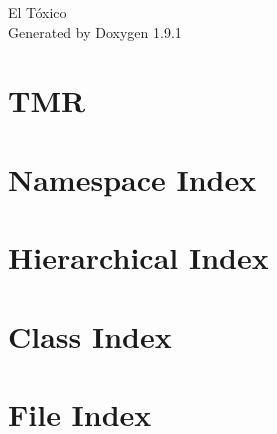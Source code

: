 \let\mypdfximage\pdfximage\def\pdfximage{\immediate\mypdfximage}\documentclass[twoside]{book}
\newcommand{\+}{\discretionary{\mbox{\scriptsize$\hookleftarrow$}}{}{}}
\newcommand{\clearemptydoublepage}{%
  \newpage{\pagestyle{empty}\cleardoublepage}%
}
\begin{document}
\raggedbottom

\hypersetup{pageanchor=false,
             bookmarksnumbered=true,
             pdfencoding=unicode
            }
\begin{titlepage}
\vspace*{7cm}
\begin{center}%
{\Large El Tóxico }\\
\vspace*{1cm}
{\large Generated by Doxygen 1.9.1}\\
\end{center}
\end{titlepage}
\clearemptydoublepage
{}
\tableofcontents
\clearemptydoublepage
{}
\hypersetup{pageanchor=true}

\chapter{TMR}
\label{index}\hypertarget{index}{}
\chapter{Namespace Index}

\chapter{Hierarchical Index}

\chapter{Class Index}

\chapter{File Index}

\end{document}
